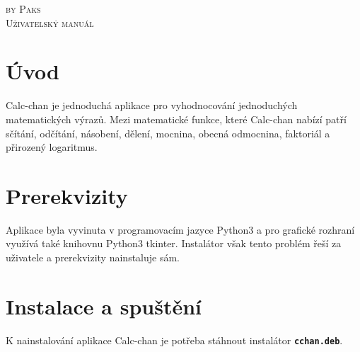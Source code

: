 \documentclass[a4paper, 11pt]{article}
\begin{document}
\begin{titlepage}
\vspace*{\fill}
 {\Large \textsc{by Paks}}\\[0.3em]
{\fontsize{40}{40}\textsc{Uživatelský manuál}}
\vspace*{\fill}
\end{titlepage}
	
\tableofcontents

\newpage

\section{Úvod}
Calc-chan je jednoduchá aplikace pro vyhodnocování jednoduchých matematických výrazů. Mezi matematické funkce, které Calc-chan nabízí patří sčítání, odčítání, násobení, dělení, mocnina, obecná odmocnina, faktoriál a přirozený logaritmus.

\section{Prerekvizity}
Aplikace byla vyvinuta v programovacím jazyce Python3 a pro grafické rozhraní využívá také knihovnu Python3 tkinter. Instalátor však tento problém řeší za uživatele a prerekvizity nainstaluje sám.

\section{Instalace a spuštění}
K nainstalování aplikace Calc-chan je potřeba stáhnout instalátor \texttt{\textbf{cchan.deb}}. \\
\end{document}
